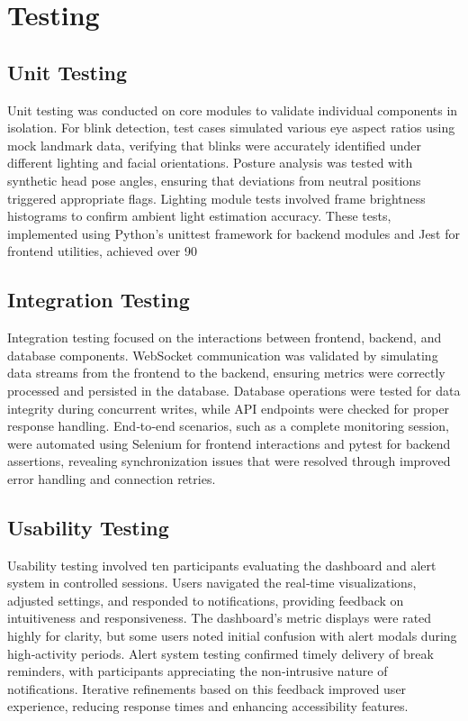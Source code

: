 \documentclass[12pt]{report}
\begin{document}

\chapter{Testing}

\section{Unit Testing}

Unit testing was conducted on core modules to validate individual components in isolation. For blink detection, test cases simulated various eye aspect ratios using mock landmark data, verifying that blinks were accurately identified under different lighting and facial orientations. Posture analysis was tested with synthetic head pose angles, ensuring that deviations from neutral positions triggered appropriate flags. Lighting module tests involved frame brightness histograms to confirm ambient light estimation accuracy. These tests, implemented using Python’s unittest framework for backend modules and Jest for frontend utilities, achieved over 90%

\section{Integration Testing}

Integration testing focused on the interactions between frontend, backend, and database components. WebSocket communication was validated by simulating data streams from the frontend to the backend, ensuring metrics were correctly processed and persisted in the database. Database operations were tested for data integrity during concurrent writes, while API endpoints were checked for proper response handling. End‑to‑end scenarios, such as a complete monitoring session, were automated using Selenium for frontend interactions and pytest for backend assertions, revealing synchronization issues that were resolved through improved error handling and connection retries.

\section{Usability Testing}

Usability testing involved ten participants evaluating the dashboard and alert system in controlled sessions. Users navigated the real‑time visualizations, adjusted settings, and responded to notifications, providing feedback on intuitiveness and responsiveness. The dashboard’s metric displays were rated highly for clarity, but some users noted initial confusion with alert modals during high‑activity periods. Alert system testing confirmed timely delivery of break reminders, with participants appreciating the non‑intrusive nature of notifications. Iterative refinements based on this feedback improved user experience, reducing response times and enhancing accessibility features.
\end{document}

